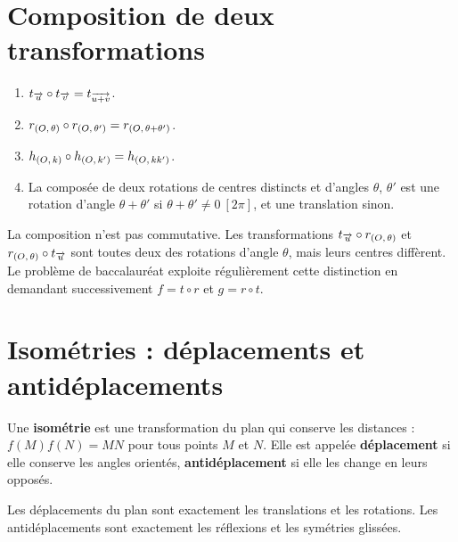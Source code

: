 \section{Composition de deux transformations}

\begin{propriete}
\begin{enumerate}[label=\textbf{\arabic*.}, leftmargin=*, itemsep=0.15em]
  \item $t_{\overrightarrow{u}} \circ t_{\overrightarrow{v}} = t_{\overrightarrow{u+v}}$.
  \item $r_{(O,\,\theta)} \circ r_{(O,\,\theta')} = r_{(O,\,\theta+\theta')}$.
  \item $h_{(O,\,k)} \circ h_{(O,\,k')} = h_{(O,\,kk')}$.
  \item La composée de deux rotations de centres distincts et d'angles
        $\theta$, $\theta'$ est une rotation d'angle $\theta+\theta'$ si
        $\theta+\theta' \neq 0 \ [2\pi]$, et une translation sinon.
\end{enumerate}
\end{propriete}

\begin{avertissement}
La composition n'est pas commutative. Les transformations
$t_{\overrightarrow{u}} \circ r_{(O,\,\theta)}$ et $r_{(O,\,\theta)} \circ t_{\overrightarrow{u}}$ sont
toutes deux des rotations d'angle $\theta$, mais leurs centres diffèrent. Le
problème de baccalauréat exploite régulièrement cette distinction en
demandant successivement $f = t \circ r$ et $g = r \circ t$.
\end{avertissement}

\section{Isométries : déplacements et antidéplacements}

\begin{definition}[isométrie]
Une \textbf{isométrie} est une transformation du plan qui conserve les
distances : $f(M)f(N) = MN$ pour tous points $M$ et $N$. Elle est appelée
\textbf{déplacement} si elle conserve les angles orientés,
\textbf{antidéplacement} si elle les change en leurs opposés.
\end{definition}

\begin{theoreme}
Les déplacements du plan sont exactement les translations et les rotations.
Les antidéplacements sont exactement les réflexions et les symétries
glissées.
\end{theoreme}


